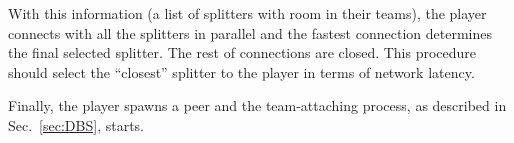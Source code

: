With this information (a list of splitters with room in their teams),
the player connects with all the splitters in parallel and the fastest
connection determines the final selected splitter. The rest of
connections are closed. This procedure should select the ``closest''
splitter to the player in terms of network latency.

Finally, the player spawns a peer and the team-attaching process, as
described in Sec.~\ref{sec:DBS}, starts.

